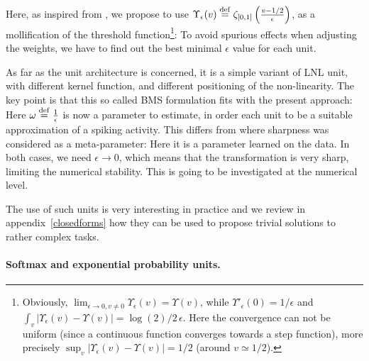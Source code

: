 Here, as inspired from \cite{cessac_using_2012}, we propose to use $\Upsilon_\epsilon(v) \stackrel {\rm def}{=} \zeta_{[0,1]}\left(\frac{v-1/2}{\epsilon}\right)$, as a mollification of the threshold function\footnote{Obviously, $\lim_{\epsilon \rightarrow 0, v \neq 0} \Upsilon_\epsilon(v) = \Upsilon(v)$, while $\Upsilon'_\epsilon(0) = 1/\epsilon$ and $\int_v |\Upsilon_\epsilon(v) - \Upsilon(v)| = \log(2)/2 \, \epsilon$. Here the convergence can not be uniform (since a continuous function converges towards a step function), more precisely $\sup_v |\Upsilon_\epsilon(v) - \Upsilon(v)| = 1/2$ (around $v\simeq 1/2$). 
}: 
To avoid spurious effects when adjusting the weights, we have to find out the best minimal $\epsilon$ value for each unit.

As far as the unit architecture is concerned, it is a simple variant of LNL unit, with different kernel function, and different positioning of the non-linearity. The key point is that this so called BMS formulation fits with the present approach:
Here $\omega\stackrel {\rm def}{=}\frac{1}{\epsilon}$ is now a parameter to estimate, in order each unit to be a suitable approximation of a spiking activity. This differs from \cite{cessac_using_2012} where sharpness was considered as a meta-parameter: Here it is a parameter learned on the data. In both cases, we need ${\epsilon \rightarrow 0}$, which means that the transformation is very sharp, limiting the numerical stability. This is going to be investigated at the numerical level.

The use of such units is very interesting in practice and we review in appendix~\ref{closedforms} how they can be used to propose trivial solutions to rather complex tasks.

\paragraph{Softmax and exponential probability units.} 

